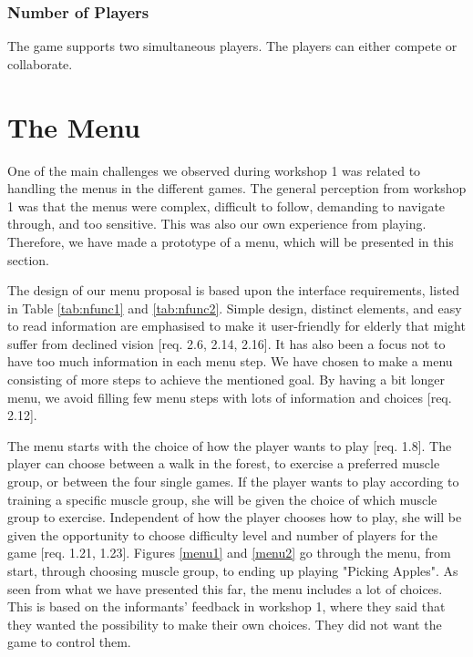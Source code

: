 \subsubsection{Number of Players} 
The game supports two simultaneous players. The players can either compete or collaborate. 


\section{The Menu}
\label{sec:menu}

One of the main challenges we observed during workshop 1 was related to handling the menus in the different games. The general perception from workshop 1 was that the menus were complex, difficult to follow, demanding to navigate through, and too sensitive. This was also our own experience from playing. Therefore, we have made a prototype of a menu, which will be presented in this section.

The design of our menu proposal is based upon the interface requirements, listed in Table \ref{tab:nfunc1} and \ref{tab:nfunc2}. Simple design, distinct elements, and easy to read information are emphasised to make it user-friendly for elderly that might suffer from declined vision [req. 2.6, 2.14, 2.16]. It has also been a focus not to have too much information in each menu step. We have chosen to make a menu consisting of more steps to achieve the mentioned goal. By having a bit longer menu, we avoid filling few menu steps with lots of information and choices [req. 2.12].    

The menu starts with the choice of how the player wants to play [req. 1.8]. The player can choose between a walk in the forest, to exercise a preferred muscle group, or between the four single games. If the player wants to play according to training a specific muscle group, she will be given the choice of which muscle group to exercise. Independent of how the player chooses how to play, she will be given the opportunity to choose difficulty level and number of players for the game [req. 1.21, 1.23]. Figures \ref{menu1} and \ref{menu2} go through the menu, from start, through choosing muscle group, to ending up playing "Picking Apples". As seen from what we have presented this far, the menu includes a lot of choices. This is based on the informants' feedback in workshop 1, where they said that they wanted the possibility to make their own choices. They did not want the game to control them.   

